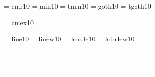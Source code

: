  \font\twfvrm  = cmr10     %
 \font\twfvmin  = min10    %
 \font\twfvtmin = tmin10   %
 \font\twfvgt   = goth10   %
 \font\twfvtgt  = tgoth10  %

 \font\tenex   = cmex10 

\font\tenln    = line10
\font\tenlnw   = linew10  
\font\tencirc  = lcircle10 %
\font\tencircw = lcirclew10 %

%
\ifnum{}\tenln=\tencirc \else 
  \immediate{}\fi
\ifnum{}\tenlnw=\tencircw \else 
  \immediate{}\fi


\def\cmfont@{\def\rm{\protect\prm}\def\sl{\protect\psl}%
\def\bf{\protect\pbf\iftdir\protect\pgt\protect\ptgt\else\protect\ptgt\protect\pgt\fi}}\cmfont@
%
\def\cmfont{\cmfont@\rm}%
\def\mcfont{\def\rm{\protect\pbk}\def\sl{\protect\psbk}%
\def\bf{\protect\pbbk\iftdir\protect\pgt\protect\ptgt\else\protect\ptgt\protect\pgt\fi}\rm}%
%
\def\it{\protect\pit}
\def\sf{\protect\psf}
\def\sc{\protect\psc}
\def\tt{\protect\ptt}
%
\def\mc{\iftdir\protect\pmin\protect\ptmin\else\protect\ptmin\protect\pmin\fi}
\def\gt{\iftdir\protect\pgt\protect\ptgt\else\protect\ptgt\protect\pgt\fi}
%
\def\bk{\protect\pbk}
\def\mbk{\protect\pmbk}
\def\bbk{\protect\pbbk}
\def\ebk{\protect\pebk}
\def\sbk{\protect\psbk}
\def\smbk{\protect\psmbk}
\def\sbbk{\protect\psbbk}
\def\sebk{\protect\psebk}
\def\elite{\protect\pel}
\def\belite{\protect\pbel}
\def\pica{\protect\ppi}
\def\bpica{\protect\pbpi}

